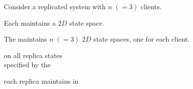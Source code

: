 \begin{frame}{}
  \centerline{\large Consider a replicated system with $n \; (=3)$ clients.}

\end{frame}

\begin{frame}{}
  \centerline{\large Each  maintains a $2D$ state space.}


  \centerline{\large The  maintains $n \; (=3)$ $2D$ state spaces, one for each client.}
\end{frame}

\begin{frame}{}
  \begin{center}
    {\large {} on all replica states \\ specified by the }


    {\large {} each replica maintains in }
  \end{center}
\end{frame}

